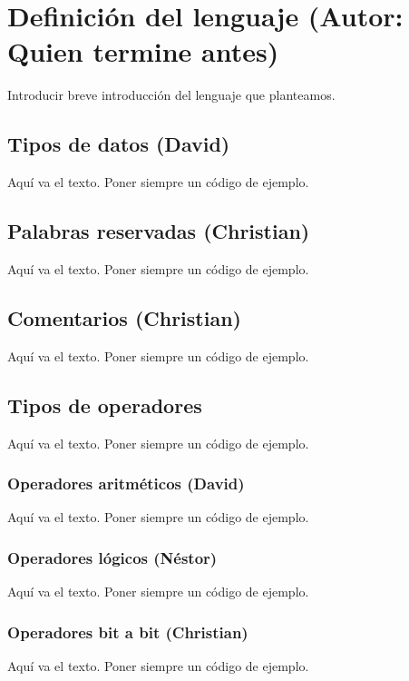 \documentclass[11pt, english]{article}
\begin{document}
\newcommand{\CC}{C\nolinebreak\hspace{-.05em}\raisebox{.4ex}{\tiny\bf +}\nolinebreak\hspace{-.10em}\raisebox{.4ex}{\tiny\bf +}}
\def\CC{{C\nolinebreak[4]\hspace{-.05em}\raisebox{.4ex}{\tiny\bf ++}}}

\tableofcontents
\newpage

\section{Definición del lenguaje (Autor: Quien termine antes)}
Introducir breve introducción del lenguaje que planteamos.
\newpage

\subsection{Tipos de datos (David)}
Aquí va el texto. Poner siempre un código de ejemplo.
\newpage

\subsection{Palabras reservadas (Christian)}
Aquí va el texto. Poner siempre un código de ejemplo.
\newpage

\subsection{Comentarios (Christian)}
Aquí va el texto. Poner siempre un código de ejemplo.
\newpage

\subsection{Tipos de operadores}
Aquí va el texto. Poner siempre un código de ejemplo.

\subsubsection{Operadores aritméticos (David)}
Aquí va el texto. Poner siempre un código de ejemplo.

\subsubsection{Operadores lógicos (Néstor)}
Aquí va el texto. Poner siempre un código de ejemplo.

\subsubsection{Operadores bit a bit (Christian)}
Aquí va el texto. Poner siempre un código de ejemplo.
\end{document}
